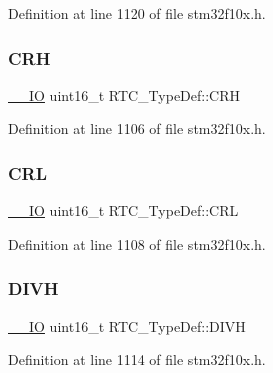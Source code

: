 Definition at line 1120 of file stm32f10x.\+h.

\mbox{\label{struct_r_t_c___type_def_aad5162f4b5b15deb174479e8e543db82}} 
\subsubsection{\texorpdfstring{C\+RH}{CRH}}
{\footnotesize\ttfamily \hyperlink{core__sc300_8h_aec43007d9998a0a0e01faede4133d6be}{\+\_\+\+\_\+\+IO} uint16\+\_\+t R\+T\+C\+\_\+\+Type\+Def\+::\+C\+RH}



Definition at line 1106 of file stm32f10x.\+h.

\mbox{\label{struct_r_t_c___type_def_a95b9e1ed044a4e1cc3632326e7250767}} 
\subsubsection{\texorpdfstring{C\+RL}{CRL}}
{\footnotesize\ttfamily \hyperlink{core__sc300_8h_aec43007d9998a0a0e01faede4133d6be}{\+\_\+\+\_\+\+IO} uint16\+\_\+t R\+T\+C\+\_\+\+Type\+Def\+::\+C\+RL}



Definition at line 1108 of file stm32f10x.\+h.

\mbox{\label{struct_r_t_c___type_def_a224b675d0ecad8b6e26d9e4c32691a18}} 
\subsubsection{\texorpdfstring{D\+I\+VH}{DIVH}}
{\footnotesize\ttfamily \hyperlink{core__sc300_8h_aec43007d9998a0a0e01faede4133d6be}{\+\_\+\+\_\+\+IO} uint16\+\_\+t R\+T\+C\+\_\+\+Type\+Def\+::\+D\+I\+VH}



Definition at line 1114 of file stm32f10x.\+h.

\mbox{\label{struct_r_t_c___type_def_ad0c75a7cc4e925da0faedcd8860cb43a}} 
